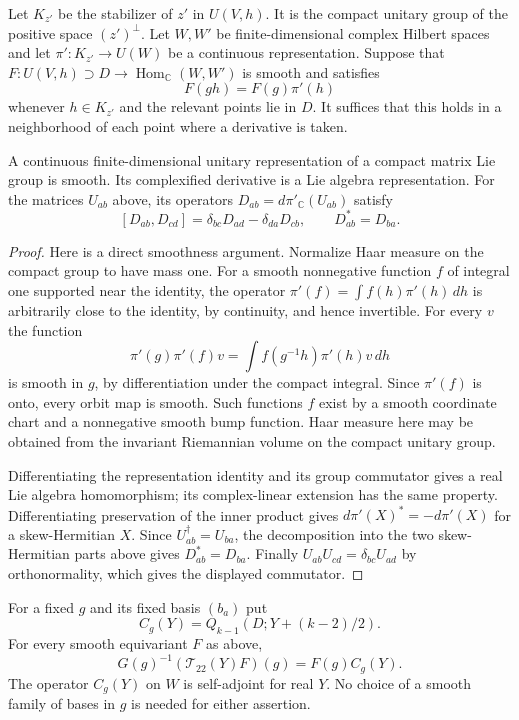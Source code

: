 Let $K_{z'}$ be the stabilizer of $z'$ in $U(V,h)$.
It is the compact unitary group of the positive space
$(z')^\perp$.  Let $W,W'$ be finite-dimensional complex
Hilbert spaces and let $\pi':K_{z'}\to U(W)$ be a
continuous representation.  Suppose that
$F:U(V,h)\supset D\to\operatorname{Hom}_{\mathbb C}(W,W')$
is smooth and satisfies
\begin{equation}\label{rp-equivariance}
                     F(gh)=F(g)\pi'(h)
\end{equation}
whenever $h\in K_{z'}$ and the relevant points lie in $D$.
It suffices that this holds in a neighborhood of each
point where a derivative is taken.

\begin{lemma}\label{rp-unitary-derivative}
A continuous finite-dimensional unitary representation
of a compact matrix Lie group is smooth.  Its
complexified derivative is a Lie algebra representation.
For the matrices $U_{ab}$ above, its operators
$D_{ab}=d\pi'_{\mathbb C}(U_{ab})$ satisfy
\[
 [D_{ab},D_{cd}]=\delta_{bc}D_{ad}-\delta_{da}D_{cb},
                      \qquad D_{ab}^*=D_{ba}.
\]
\end{lemma}

\begin{proof}
Here is a direct smoothness argument.  Normalize Haar
measure on the compact group to have mass one.  For a
smooth nonnegative function $f$ of integral one supported
near the identity, the operator
$\pi'(f)=\int f(h)\pi'(h)\,dh$ is arbitrarily close to
the identity, by continuity, and hence invertible.
For every $v$ the function
\[
 \pi'(g)\pi'(f)v=\int f(g^{-1}h)\pi'(h)v\,dh
\]
is smooth in $g$, by differentiation under the compact
integral.  Since $\pi'(f)$ is onto, every orbit map is
smooth.  Such functions $f$ exist by a smooth coordinate
chart and a nonnegative smooth bump function.  Haar
measure here may be obtained from the invariant
Riemannian volume on the compact unitary group.

Differentiating the representation identity and its
group commutator gives a real Lie algebra homomorphism;
its complex-linear extension has the same property.
Differentiating preservation of the inner product gives
$d\pi'(X)^*=-d\pi'(X)$ for a skew-Hermitian $X$.
Since $U_{ab}^\dagger=U_{ba}$, the decomposition into
the two skew-Hermitian parts above gives
$D_{ab}^*=D_{ba}$.  Finally
$U_{ab}U_{cd}=\delta_{bc}U_{ad}$ by orthonormality,
which gives the displayed commutator.
\end{proof}

\begin{corollary}\label{rp-finite-terminal}
For a fixed $g$ and its fixed basis $(b_a)$ put
\[
                 C_g(Y)=Q_{k-1}(D;Y+(k-2)/2).
\]
For every smooth equivariant $F$ as above,
\begin{equation}\label{rp-evaluation-transfer}
             G(g)^{-1}(\mathcal T_{22}(Y)F)(g)=F(g)C_g(Y).
\end{equation}
The operator $C_g(Y)$ on $W$ is self-adjoint for real
$Y$.  No choice of a smooth family of bases in $g$ is
needed for either assertion.
\end{corollary}

